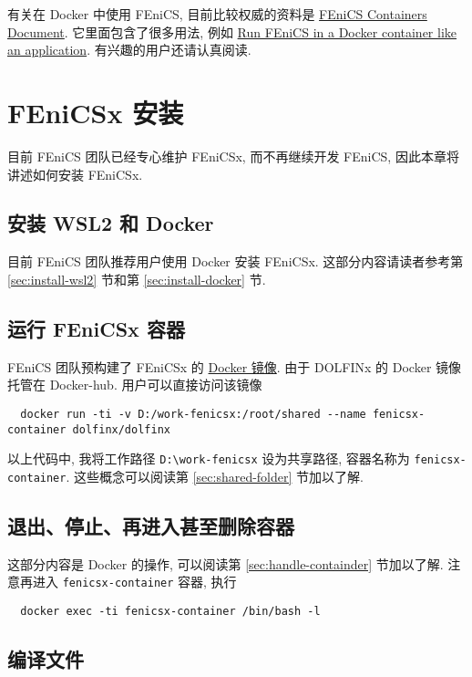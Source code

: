 \documentclass[fontset=founder]{ctexrep}
\begin{document}
有关在 Docker 中使用 FEniCS,
目前比较权威的资料是 \href{https://fenics.readthedocs.io/projects/containers/en/latest/index.html}{FEniCS Containers Document}.
它里面包含了很多用法,
例如 \href{https://fenics.readthedocs.io/projects/containers/en/latest/work_flows.html#run-fenics-in-a-docker-container-like-an-application}{Run FEniCS in a Docker container like an application}.
有兴趣的用户还请认真阅读.

\chapter{FEniCSx 安装}

目前 FEniCS 团队已经专心维护 FEniCSx,
而不再继续开发 FEniCS,
因此本章将讲述如何安装 FEniCSx.

\section{安装 WSL2 和 Docker}

目前 FEniCS 团队推荐用户使用 Docker 安装 FEniCSx.
这部分内容请读者参考第 \ref{sec:install-wsl2} 节和第 \ref{sec:install-docker} 节.

\section{运行 FEniCSx 容器}

FEniCS 团队预构建了 FEniCSx 的 \href{https://hub.docker.com/r/dolfinx/dolfinx}{Docker 镜像}.
由于 DOLFINx 的 Docker 镜像托管在 Docker-hub.
用户可以直接访问该镜像
\begin{lstlisting}
  docker run -ti -v D:/work-fenicsx:/root/shared --name fenicsx-container dolfinx/dolfinx
\end{lstlisting}
以上代码中,
我将工作路径 \texttt{D:\textbackslash work-fenicsx} 设为共享路径,
容器名称为 \texttt{fenicsx-container}.
这些概念可以阅读第 \ref{sec:shared-folder} 节加以了解.

\section{退出、停止、再进入甚至删除容器}

这部分内容是 Docker 的操作,
可以阅读第 \ref{sec:handle-containder} 节加以了解.
注意再进入 \texttt{fenicsx-container} 容器,
执行
\begin{lstlisting}
  docker exec -ti fenicsx-container /bin/bash -l
\end{lstlisting}

\section{编译文件}
\end{document}
